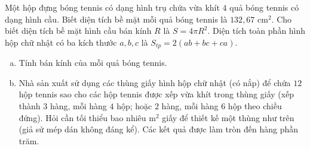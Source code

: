 \begin{bt}%
Một hộp đựng bóng tennis có dạng hình trụ chứa vừa khít $4$ quả bóng tennis có dạng hình cầu. Biết diện tích bề mặt mỗi quả bóng tennis là $132{,}67\text{ cm}^2$.
Cho biết diện tích bề mặt hình cầu bán kính $R$ là $S = 4\pi R^2$. Diện tích toàn phần hình hộp chữ nhật có ba kích thước $a, b, c$ là $S_{tp} = 2(ab + bc + ca)$.
\begin{enumerate}[a)]
	\item Tính bán kính của mỗi quả bóng tennis.
	\item Nhà sản xuất sử dụng các thùng giấy hình hộp chữ nhật (có nắp) để chứa $12$ hộp tennis sao cho các hộp tennis được xếp vừa khít trong thùng giấy (xếp thành $3$ hàng, mỗi hàng $4$ hộp; hoặc $2$ hàng, mỗi hàng $6$ hộp theo chiều đứng). Hỏi cần tối thiểu bao nhiêu $\text{m}^2$ giấy để thiết kế một thùng như trên (giả sử mép dán không đáng kể). Các kết quả được làm tròn đến hàng phần trăm.
\end{enumerate}
\end{bt}
